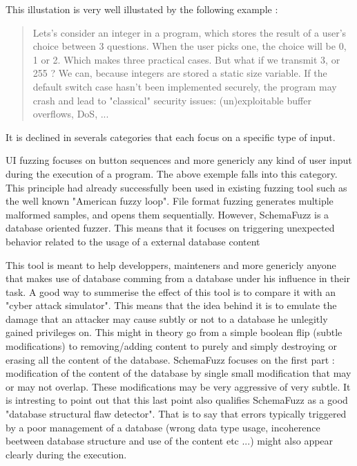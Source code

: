 \documentclass{article}
\begin{document}
\begin{empfile}
This illustation is very well illustated by the following example :
				\begin{quotation}
				Lets's consider an integer in a program, which stores the result of a user's choice between 3 questions. When the user picks one, the choice will be 0, 1 or 2. Which makes three practical cases. But what if we transmit 3, or 255 ? We can, because integers are stored a static size variable. If the default switch case hasn't been implemented securely, the program may crash and lead to "classical" security issues: (un)exploitable buffer overflows, DoS, ... 
				\end{quotation}

It is declined in severals categories that each focus on a specific type of input.
 
UI fuzzing focuses on button sequences and more genericly any kind of user input during the execution of a program. The above exemple falls into this category.
This principle had already successfully been used in existing fuzzing tool such as the well known "American fuzzy loop".
File format fuzzing generates multiple malformed samples, and opens them sequentially.
However, SchemaFuzz is a database oriented fuzzer. This means that it focuses on triggering unexpected behavior related to the usage of a external database content   

This tool is meant to help developpers, mainteners and more genericly anyone that makes use of database comming from a database under his influence in their task. A good way to summerise the effect of this tool is to compare it with an "cyber attack simulator".
This means that the idea behind it is to emulate the damage that an attacker may cause subtly or not to a database he unlegitly gained privileges on. This might in theory go from a simple boolean flip (subtle modifications) to removing/adding content to purely and simply destroying or erasing all the content of the database.
SchemaFuzz focuses on the first part : modification of the content of the database by single small modification that may or may not overlap. These modifications may be very aggressive of very subtle.
It is intresting to point out that this last point also qualifies SchemaFuzz as a good "database structural flaw detector".
That is to say that errors typically triggered by a poor management of a database (wrong data type usage, incoherence beetween database structure and use of the content etc ...) might also appear clearly during the execution.   

\end{empfile}
\end{document}
